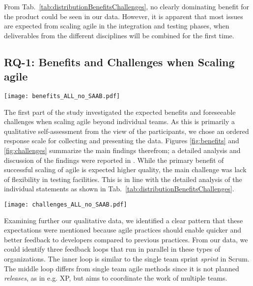 \documentclass[10pt,a4paper]{IEEEtran} %
\begin{document}
From Tab.~\ref{tab:distributionBenefitsChallenges}, no clearly dominating benefit for the
product could be seen in our data. However, it is apparent that most issues are expected from scaling agile in the integration and testing phases, when deliverables from the
different disciplines will be combined for the first time.


\subsection{RQ-1: Benefits and Challenges when Scaling agile}

\begin{figure*}[ht]
\centering
\texttt{[image: benefits\_ALL\_no\_SAAB.pdf]}
\caption{Expected benefits when scaling agile beyond software development teams; participants expressed their feedback using an ordered response scale.}
\label{fig:benefits}
\end{figure*}
The first part of the study investigated the expected benefits and foreseeable challenges when scaling agile beyond individual teams. 
As this is primarily a qualitative self-assessment from the view of the participants, we chose an ordered response scale for collecting and presenting the data.
Figures \ref{fig:benefits} and \ref{fig:challenges} summarize the main findings therefrom; a detailed analysis and discussion of the findings were reported in \cite{berger_expectations_2015}.
While the primary benefit of successful scaling of agile is expected higher quality, the main challenge was lack of flexibility in testing facilities. 
This is in line with the detailed analysis of the individual statements as shown in Tab.~\ref{tab:distributionBenefitsChallenges}.


\begin{figure*}[t]
\centering
\texttt{[image: challenges\_ALL\_no\_SAAB.pdf]}
\caption{Foreseeable challenges when scaling agile beyond software development teams; participants expressed their feedback using an ordered response scale.}
\label{fig:challenges}
\end{figure*}

Examining further our qualitative data, we identified a clear pattern that these expectations were mentioned because agile practices should enable quicker and better feedback to developers compared to previous practices. From our data, we could identify three feedback loops that run in parallel in these types of organizations.
The inner loop is similar to the single team sprint \emph{sprint} in Scrum. The middle loop differs from single team agile methods  since it is not planned \emph{releases}, as in e.g. XP, but  aims to coordinate the work of multiple teams.
\end{document}
